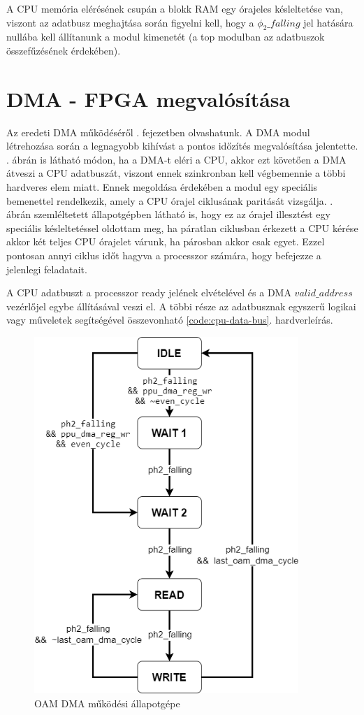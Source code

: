 A CPU memória elérésének csupán a blokk RAM egy órajeles késleltetése van, viszont az adatbusz meghajtása során figyelni kell, hogy a $\phi_2\_falling$ jel hatására nullába kell állítanunk a modul kimenetét (a top modulban az adatbuszok összefűzésének érdekében).

\section{DMA - FPGA megvalósítása}

Az eredeti DMA működéséről . fejezetben olvashatunk. A DMA modul létrehozása során a legnagyobb kihívást a pontos időzítés megvalósítása jelentette. . ábrán is látható módon, ha a DMA-t eléri a CPU, akkor ezt követően a DMA átveszi a CPU adatbuszát, viszont ennek szinkronban kell végbemennie a többi hardveres elem miatt. Ennek megoldása érdekében a modul egy speciális bemenettel rendelkezik, amely a CPU órajel ciklusának paritását vizsgálja. . ábrán szemléltetett állapotgépben látható is, hogy ez az órajel illesztést egy speciális késleltetéssel oldottam meg, ha páratlan ciklusban érkezett a CPU kérése akkor két teljes CPU órajelet várunk, ha párosban akkor csak egyet. Ezzel pontosan annyi ciklus időt hagyva a processzor számára, hogy befejezze a jelenlegi feladatait.

A CPU adatbuszt a processzor ready jelének elvételével és a DMA $valid\_address$ vezérlőjel egybe állításával veszi el. A többi része az adatbusznak egyszerű logikai vagy műveletek segítségével összevonható \ref{code:cpu-data-bus}. hardverleírás. 

\begin{figure}[H]
\centering
\includegraphics[width=100mm, keepaspectratio]{figures/sprite-dma-FSM}
\caption{OAM DMA működési állapotgépe} 
\label{fig:sprite-dma-FSM}
\end{figure}

